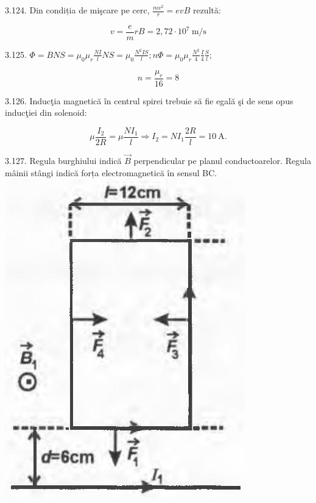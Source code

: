 \documentclass[10pt]{article}
\begin{document}
3.124. Din condiția de mişcare pe cerc, $\frac{m v^{2}}{r}=e v B$ rezultă:

$$
v=\frac{e}{m} r B=2,72 \cdot 10^{7} \mathrm{~m} / \mathrm{s}
$$

3.125. $\Phi=B N S=\mu_{0} \mu_{r} \frac{N I}{l} N S=\mu_{0} \frac{N^{2} I S}{l} ; n \Phi=\mu_{0} \mu_{r} \frac{N^{2}}{4} \frac{I}{4} \frac{S}{l}$;

$$
n=\frac{\mu_{r}}{16}=8
$$

3.126. Inducţia magnetică în centrul spirei trebuie să fie egală şi de sens opus inducţiei din solenoid:

$$
\mu \frac{I_{2}}{2 R}=\mu \frac{N I_{1}}{l} \Rightarrow I_{2}=N I_{1} \frac{2 R}{l}=10 \mathrm{~A} .
$$

3.127. Regula burghiului indică $\vec{B}$ perpendicular pe planul conductoarelor. Regula mâinii stângi indică forța electromagnetică în sensul BC.\\
\includegraphics[max width=\textwidth, center]{2025_07_01_5b3ff9fa0d508c8e9f17g-365}
\end{document}
